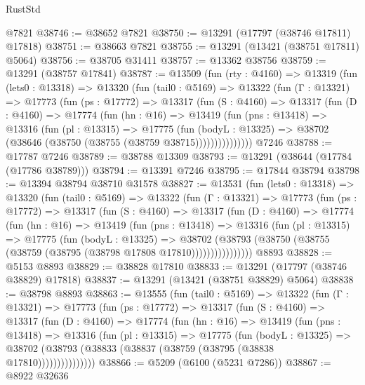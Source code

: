 \begin{lexlean}{RustStd}
\begin{coremodule}
    @7821
@38746 := @38652 @7821
@38750 := @13291 (@17797 (@38746 @17811) @17818)
@38751 := @38663 @7821
@38755 := @13291 (@13421 (@38751 @17811) @5064)
@38756 := @38705 @31411
@38757 := @13362 @38756
@38759 := @13291 (@38757 @17841)
@38787 := @13509
    (fun (rty : @4160) =>
    @13319
      (fun (lets0 : @13318) =>
      @13320
        (fun (tail0 : @5169) =>
        @13322
          (fun (Γ : @13321) =>
          @17773
            (fun (ps : @17772) =>
            @13317
              (fun (S : @4160) =>
              @13317
                (fun (D : @4160) =>
                @17774
                  (fun (hn : @16) =>
                  @13419
                    (fun (pns : @13418) =>
                    @13316
                      (fun (pl : @13315) =>
                      @17775
                        (fun (bodyL : @13325) =>
                        @38702 (@38646 (@38750 (@38755 (@38759 @38715)))))))))))))))
    @7246
@38788 := @17787 @7246
@38789 := @38788 @13309
@38793 := @13291 (@38644 (@17784 (@17786 @38789)))
@38794 := @13391 @7246
@38795 := @17844 @38794
@38798 := @13394 @38794 @38710 @31578
@38827 := @13531
    (fun (lets0 : @13318) =>
    @13320
      (fun (tail0 : @5169) =>
      @13322
        (fun (Γ : @13321) =>
        @17773
          (fun (ps : @17772) =>
          @13317
            (fun (S : @4160) =>
            @13317
              (fun (D : @4160) =>
              @17774
                (fun (hn : @16) =>
                @13419
                  (fun (pns : @13418) =>
                  @13316
                    (fun (pl : @13315) =>
                    @17775
                      (fun (bodyL : @13325) =>
                      @38702
                        (@38793
                          (@38750 (@38755 (@38759 (@38795 (@38798 @17808 @17810))))))))))))))))
    @8893
@38828 := @5153 @8893
@38829 := @38828 @17810
@38833 := @13291 (@17797 (@38746 @38829) @17818)
@38837 := @13291 (@13421 (@38751 @38829) @5064)
@38838 := @38798 @8893
@38863 := @13555
    (fun (tail0 : @5169) =>
    @13322
      (fun (Γ : @13321) =>
      @17773
        (fun (ps : @17772) =>
        @13317
          (fun (S : @4160) =>
          @13317
            (fun (D : @4160) =>
            @17774
              (fun (hn : @16) =>
              @13419
                (fun (pns : @13418) =>
                @13316
                  (fun (pl : @13315) =>
                  @17775
                    (fun (bodyL : @13325) =>
                    @38702 (@38793 (@38833 (@38837 (@38759 (@38795 (@38838 @17810)))))))))))))))
@38866 := @5209 (@6100 (@5231 @7286))
@38867 := @8922 @32636

\end{coremodule}
\end{lexlean}

